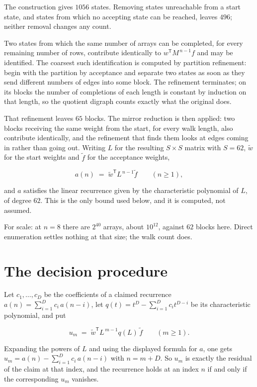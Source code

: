 \documentclass[11pt]{article}
\theoremstyle{definition}
\begin{document}
The construction gives $1056$ states. Removing states unreachable from a start state, and states from which no accepting state can be reached, leaves $496$; neither removal changes any count.

Two states from which the same number of arrays can be completed, for every remaining number of rows, contribute identically to $w^{\mathsf T}M^{\,n-1}f$ and may be identified. The coarsest such identification is computed by partition refinement: begin with the partition by acceptance and separate two states as soon as they send different numbers of edges into some block. The refinement terminates; on its blocks the number of completions of each length is constant by induction on that length, so the quotient digraph counts exactly what the original does.

That refinement leaves $65$ blocks. The mirror reduction is then applied: two blocks receiving the same weight from the start, for every walk length, also contribute identically, and the refinement that finds them looks at edges coming in rather than going out. Writing $L$ for the resulting $S \times S$ matrix with $S = 62$, $\tilde w$ for the start weights and $\tilde f$ for the acceptance weights,

\[a(n) \;=\; \tilde w^{\mathsf T} L^{\,n-1} \tilde f \qquad (n \ge 1),\]

and $a$ satisfies the linear recurrence given by the characteristic polynomial of $L$, of degree $62$. This is the only bound used below, and it is computed, not assumed.

For scale: at $n = 8$ there are $2^{40}$ arrays, about $10^{12}$, against $62$ blocks here. Direct enumeration settles nothing at that size; the walk count does.

\section{The decision procedure}

Let $c_1,\dots,c_D$ be the coefficients of a claimed recurrence $a(n) = \sum_{i=1}^{D} c_i\,a(n-i)$, let $q(t) = t^{D} - \sum_{i=1}^{D} c_i t^{D-i}$ be its characteristic polynomial, and put

\[u_m \;=\; \tilde w^{\mathsf T} L^{\,m-1} q(L)\,\tilde f \qquad (m \ge 1).\]

Expanding the powers of $L$ and using the displayed formula for $a$, one gets $u_m = a(n) - \sum_{i=1}^{D} c_i\,a(n-i)$ with $n = m + D$. So $u_m$ is exactly the residual of the claim at that index, and the recurrence holds at an index $n$ if and only if the corresponding $u_m$ vanishes.
\end{document}
